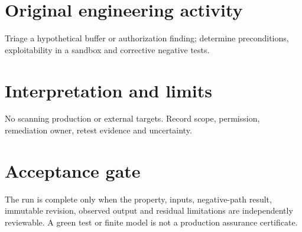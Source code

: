 \documentclass[10pt,letterpaper]{article}
\begin{document}
\section{Original engineering activity}
Triage a hypothetical buffer or authorization finding; determine preconditions, exploitability in a sandbox and corrective negative tests.
\section{Interpretation and limits}
No scanning production or external targets. Record scope, permission, remediation owner, retest evidence and uncertainty.
\section{Acceptance gate}
The run is complete only when the property, inputs, negative-path result, immutable revision, observed output and residual limitations are independently reviewable. A green test or finite model is not a production assurance certificate.
\end{document}
